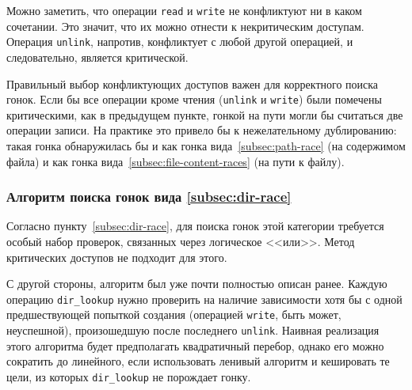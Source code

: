 Можно заметить, что операции \texttt{read} и \texttt{write} не конфликтуют ни в каком сочетании. Это значит, что их можно отнести к некритическим доступам. Операция \texttt{unlink}, напротив, конфликтует с любой другой операцией, и следовательно, является критической.

Правильный выбор конфликтующих доступов важен для корректного поиска гонок. Если бы все операции кроме чтения (\texttt{unlink} и \texttt{write}) были помечены критическими, как в предыдущем пункте, гонкой на пути могли бы считаться две операции записи. На практике это привело бы к нежелательному дублированию: такая гонка обнаружилась бы и как гонка вида~\ref{subsec:path-race} (на содержимом файла) и как гонка вида~\ref{subsec:file-content-races} (на пути к файлу).

\subsubsection{Алгоритм поиска гонок вида \ref{subsec:dir-race}}

Согласно пункту~\ref{subsec:dir-race}, для поиска гонок этой категории требуется особый набор проверок, связанных через логическое <<или>>. Метод критических доступов не подходит для этого.

С другой стороны, алгоритм был уже почти полностью описан ранее. Каждую операцию \texttt{dir\_lookup} нужно проверить на наличие зависимости хотя бы с одной предшествующей попыткой создания (операцией \texttt{write}, быть может, неуспешной), произошедшую после последнего \texttt{unlink}. Наивная реализация этого алгоритма будет предполагать квадратичный перебор, однако его можно сократить до линейного, если использовать ленивый алгоритм и кешировать те цели, из которых \texttt{dir\_lookup} не порождает гонку.
